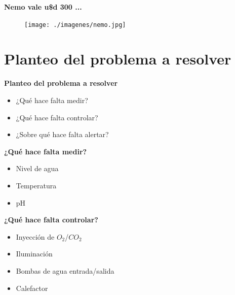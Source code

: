 \documentclass[11pt]{beamer}
\begin{document}
\begin{frame}{\LARGE{\textbf{Nemo vale u\$d 300 ...}}}
  \begin{figure}[H]
    {\texttt{[image: ./imagenes/nemo.jpg]}}
  \end{figure}	  	  	
\end{frame}


\section[Problema]{Planteo del problema a resolver}

\begin{frame}{\textbf{\LARGE{Planteo del problema a resolver}}}
  \fontsize{18pt}{18}\selectfont
  \begin{itemize}
    \item {¿Qué hace falta medir?}
      \vspace{20px}
    \item ¿Qué hace falta controlar?
      \vspace{20px}
    \item ¿Sobre qué hace falta alertar?
      \vspace{10px}
  \end{itemize}
\end{frame}

\begin{frame}{\textbf{\LARGE{¿Qué hace falta medir?}}}
  \fontsize{18pt}{18}\selectfont
  \begin{minipage}[c]{1.0\linewidth}
    \centering
      \begin{itemize}
        \item Nivel de agua		
          \vspace{20px}
        \item Temperatura
          \vspace{20px}      	
        \item pH
          \vspace{20px}
      \end{itemize}
  \end{minipage}
\end{frame}


\begin{frame}{\textbf{\LARGE{¿Qué hace falta controlar?}}}
  \fontsize{18pt}{18}\selectfont
  \begin{minipage}[c]{1.0\linewidth}
    \centering
    \begin{itemize}
        \vspace{-20px}
      \item Inyección de $O_2$/$CO_2$
        \vspace{15px}
      \item Iluminación
        \vspace{15px}
      \item Bombas de agua entrada/salida
        \vspace{15px}
      \item Calefactor
    \end{itemize}
  \end{minipage}
\end{frame}
\end{document}
